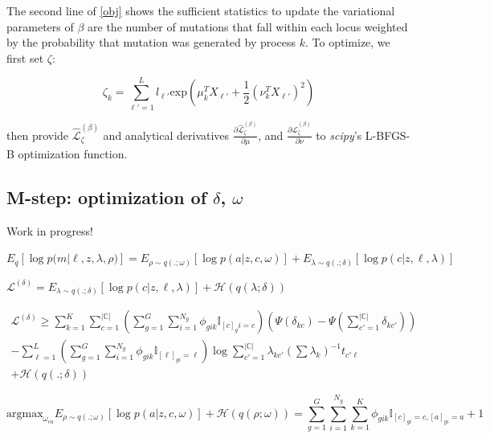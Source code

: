 \documentclass{article}
\newcommand{\Lagr}{\mathcal{L}}
\newcommand{\surrB}{\hat{\Lagr}^{(\beta)}_{\zeta}}
\begin{document}
The second line of \eqref{obj} shows the sufficient statistics to update the variational parameters of $\beta$ are the number of mutations that fall within each locus weighted by the probability that mutation was generated by process $k$. To optimize, we first set $\zeta$:

\begin{equation}
\zeta_k = \sum_{\ell'=1}^L l_{\ell'}\textrm{exp} \left( \mu_k^T X_{\ell'} + \frac{1}{2}(\nu_k^T X_{\ell'})^2 \right)
\end{equation}

then provide $\surrB$ and analytical derivatives $\frac{\partial\surrB}{\partial\mu}$, and $\frac{\partial\surrB}{\partial\nu}$ to \emph{scipy}'s L-BFGS-B optimization function.


\subsection{M-step: optimization of $\delta$, $\omega$ }

Work in progress!

$ E_q [\log{p(m | \ell, z, \lambda, \rho})] = E_{\rho \sim q(.;\omega)} [\log p(a|z,c,\omega)] + E_{\lambda \sim q(.;\delta)} [\log p(c|z,\ell,\lambda) ]$

$\Lagr^{(\delta)} = E_{\lambda \sim q(.;\delta)} [\log p(c|z,\ell,\lambda)] + \mathcal{H}(q(\lambda; \delta)) $

\begin{equation} \label{surragate}
\begin{split}
\Lagr^{(\delta)} \geq \sum_{k=1}^K \sum_{c=1}^{|\mathbb{C}|} \left(\sum_{g=1}^G\sum_{i=1}^{N_g} \phi_{gik} \mathbb{I}_{[c]_gi = c}\right) \left( \Psi(\delta_{kc}) - 		\Psi(\sum_{c'=1}^{|\mathbb{C}|} \delta_{kc'}) \right) 
	\\ - \sum_{\ell=1}^L \left(\sum_{g=1}^G\sum_{i=1}^{N_g} \phi_{gik} \mathbb{I}_{[\ell]_{gi} = \ell} \right) \log{\sum_{c'=1}^{|\mathbb{C}|} \lambda_{kc'}(\sum \lambda_k)^{-1} t_{c'\ell}} \\
	+ \mathcal{H}(q(.;\delta))
\end{split}
\end{equation}


\begin{equation}
\mathrm{argmax}_{\omega_{ca}} E_{\rho \sim q(.;\omega)} [\log p(a|z,c,\omega)] + \mathcal{H}(q(\rho; \omega)) = \sum_{g=1}^G\sum_{i=1}^{N_g}\sum_{k=1}^K \phi_{gik} \mathbb{I}_{[c]_{gi} =c, [a]_{gi} = a} + 1
\end{equation}
\end{document}
